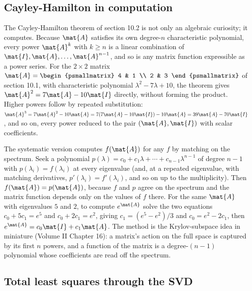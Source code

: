 \subsection{Cayley-Hamilton in computation}

The Cayley-Hamilton theorem of section 10.2 is not only an algebraic
curiosity; it computes. Because $\mat{A}$ satisfies its own degree-$n$
characteristic polynomial, every power $\mat{A}^{k}$ with $k \geq n$ is
a linear combination of $\mat{I}, \mat{A}, \ldots, \mat{A}^{n-1}$, and
so is any matrix function expressible as a power series. For the
$2 \times 2$ matrix $\mat{A} = \begin{psmallmatrix} 4 & 1 \\ 2 & 3
\end{psmallmatrix}$ of section 10.1, with characteristic polynomial
$\lambda^{2} - 7\lambda + 10$, the theorem gives $\mat{A}^{2} =
7\mat{A} - 10\mat{I}$ directly, without forming the product. Higher
powers follow by repeated substitution: $\mat{A}^{3} = 7\mat{A}^{2} -
10\mat{A} = 7(7\mat{A} - 10\mat{I}) - 10\mat{A} = 39\mat{A} -
70\mat{I}$, and so on, every power reduced to the pair $(\mat{A},
\mat{I})$ with scalar coefficients.

The systematic version computes $f(\mat{A})$ for any $f$ by matching on
the spectrum. Seek a polynomial $p(\lambda) = c_{0} + c_{1}\lambda +
\cdots + c_{n-1}\lambda^{n-1}$ of degree $n - 1$ with $p(\lambda_{i}) =
f(\lambda_{i})$ at every eigenvalue (and, at a repeated eigenvalue, with
matching derivatives, $p'(\lambda_{i}) = f'(\lambda_{i})$, and so on up
to the multiplicity). Then $f(\mat{A}) = p(\mat{A})$, because $f$ and
$p$ agree on the spectrum and the matrix function depends only on the
values of $f$ there. For the same $\mat{A}$ with eigenvalues $5$ and
$2$, to compute $e^{\mat{A}}$ solve the two equations $c_{0} + 5c_{1} =
e^{5}$ and $c_{0} + 2c_{1} = e^{2}$, giving $c_{1} = (e^{5} - e^{2})/3$
and $c_{0} = e^{2} - 2c_{1}$, then $e^{\mat{A}} = c_{0}\mat{I} +
c_{1}\mat{A}$. The method is the Krylov-subspace idea in miniature
(Volume II Chapter 16): a matrix's action on the full space is captured
by its first $n$ powers, and a function of the matrix is a degree-$(n-1)$
polynomial whose coefficients are read off the spectrum.

\subsection{Total least squares through the SVD}

